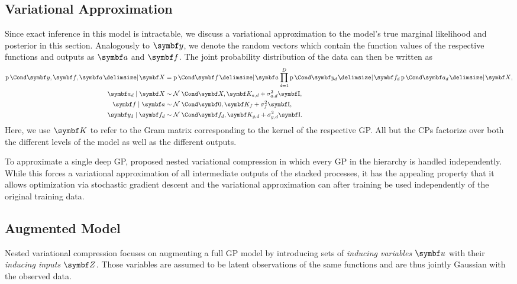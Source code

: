 \subsection{Variational Approximation}
\label{sub:timeseries_alignment:variational_approximation}
Since exact inference in this model is intractable, we discuss a variational approximation to the model's true marginal likelihood and posterior in this section.
Analogously to $\mat{y}$, we denote the random vectors which contain the function values of the respective functions and outputs as $\rv{a}$ and $\rv{f}$.
The joint probability distribution of the data can then be written as
\begin{align}
\begin{split}
    \label{eq:timeseries_alignment:full_model}
    \Prob{\rv{y}, \rv{f}, \rv{a} \given \mat{X}} &=
    \Prob{\rv{f} \given \rv{a}} \prod_{d=1}^D \Prob{\rv{y_d} \given \rv{f_d}}\Prob{\rv{a_d} \given \rv{X}}, \\
    \rv{a_d} \mid \mat{X} &\sim \Gaussian{\mat{X}, \mat{K_{a, d}} + \sigma^2_{a, d}\Eye}, \\
    \rv{f} \mid \mat{a} &\sim \Gaussian{\mat{0}, \mat{K_f} + \sigma^2_f\Eye}, \\
    \rv{y_d} \mid \mat{f_d} &\sim \Gaussian{\mat{f_d}, \mat{K_{g, d}} + \sigma^2_{y, d}\Eye}.
\end{split}
\end{align}
Here, we use $\mat{K}$ to refer to the Gram matrix corresponding to the kernel of the respective GP.
All but the CPs factorize over both the different levels of the model as well as the different outputs.

To approximate a single deep GP, \Textcite{hensman_nested_2014} proposed nested variational compression in which every GP in the hierarchy is handled independently.
While this forces a variational approximation of all intermediate outputs of the stacked processes, it has the appealing property that it allows optimization via stochastic gradient descent \parencite{hensman_gaussian_2013} and the variational approximation can after training be used independently of the original training data.

\subsection{Augmented Model}
\label{sub:timeseries_alignment:augmented_model}
Nested variational compression focuses on augmenting a full GP model by introducing sets of \emph{inducing variables} $\mat{u}$ with their \emph{inducing inputs} $\mat{Z}$.
Those variables are assumed to be latent observations of the same functions and are thus jointly Gaussian with the observed data.

